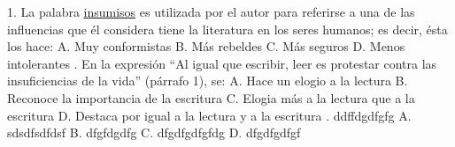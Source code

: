 \documentclass[a4paper,10pt]{article}
\begin{document}
  1. La palabra \underline{ insumisos} es utilizada por el autor para referirse a una de las influencias que él considera tiene la literatura en los seres humanos; es decir, ésta los hace:\newline \newline  
 A. Muy conformistas\newline 
 B. Más rebeldes\newline 
 C. Más seguros\newline 
 D. Menos intolerantes\newline 
 . En la expresión “Al igual que escribir, leer es protestar contra las insuficiencias de la vida” (párrafo 1), se:\newline \newline  
 A. Hace un elogio a la lectura\newline 
 B. Reconoce la importancia de la escritura\newline 
 C. Elogia más a la lectura que a la escritura\newline 
 D. Destaca por igual a la lectura y a la escritura\newline 
 . ddffdgdfgfg\newline \newline  
 A. sdsdfsdfdsf\newline 
 B. dfgfdgdfg\newline 
 C. dfgdfgdfgfdg\newline 
 D. dfgdfgdfgf\newline 
 \newline 
\end{document}
